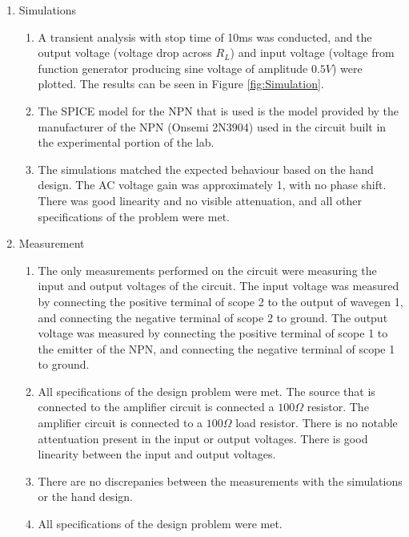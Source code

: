 \documentclass[12pt]{article}
\begin{document}
\begin{enumerate}
\begin{enumerate}
\end{enumerate}
\item Simulations
\begin{enumerate}
    \item 
    A transient analysis with stop time of 10ms was conducted, and the output voltage (voltage drop across $R_L$) and input voltage (voltage from function generator producing sine voltage of amplitude $0.5V$) were plotted. The results can be seen in Figure \ref{fig:Simulation}.
    \item 
    The SPICE model for the NPN that is used is the model provided by the manufacturer of the NPN (Onsemi 2N3904) used in the circuit built in the experimental portion of the lab.
    \item 
    The simulations matched the expected behaviour based on the hand design. The AC voltage gain was approximately 1, with no phase shift. There was good linearity and no visible attenuation, and all other specifications of the problem were met. 
\end{enumerate}
\item Measurement
\begin{enumerate}
    \item 
    The only measurements performed on the circuit were measuring the input and output voltages of the circuit. The input voltage was measured by connecting the positive terminal of scope 2 to the output of wavegen 1, and connecting the negative terminal of scope 2 to ground. The output voltage was measured by connecting the positive terminal of scope 1 to the emitter of the NPN, and connecting the negative terminal of scope 1 to ground.
    \item 
    All specifications of the design problem were met. The source that is connected to the amplifier circuit is connected a $100\Omega$ resistor. The amplifier circuit is connected to a $100\Omega$ load resistor. There is no notable attentuation present in the input or output voltages. There is good linearity between the input and output voltages. 
    \item 
    There are no discrepanies between the measurements with the simulations or the hand design.
    \item 
    All specifications of the design problem were met.
\end{enumerate}
\end{enumerate}
\end{document}
